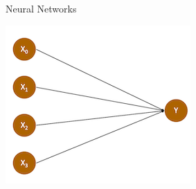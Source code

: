 \documentclass[handout]{beamer}
\begin{document}
\begin{frame}{Neural Networks}
	
	\begin{center}
		\includegraphics{../pictures/perceptron.png} \\\
	\end{center}
	
	
	
	
	
\end{frame}
\end{document}
